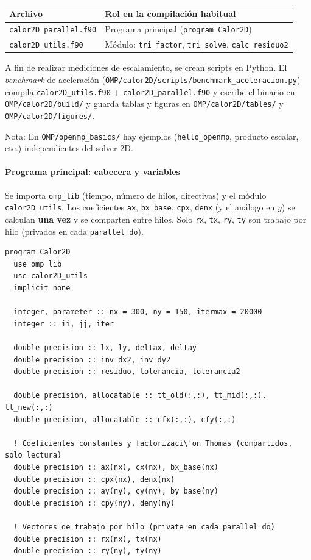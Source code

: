 \documentclass[11pt,a4paper]{article}
\begin{document}
\begin{center}
\begin{tabular}{ll}
\hline
Archivo & Rol en la compilaci\'on habitual \\
\hline
\texttt{calor2D\_parallel.f90} & Programa principal (\texttt{program Calor2D}) \\
\texttt{calor2D\_utils.f90}     & M\'odulo: \texttt{tri\_factor}, \texttt{tri\_solve}, \texttt{calc\_residuo2} \\
\hline
\end{tabular}
\end{center}

A fin de realizar mediciones de escalamiento, se crean scripts en Python. El 
\emph{benchmark} de aceleraci\'on (\texttt{OMP/calor2D/scripts/benchmark\_aceleracion.py}) compila
\texttt{calor2D\_utils.f90} + \texttt{calor2D\_parallel.f90} y escribe el binario en
\texttt{OMP/calor2D/build/} y guarda tablas y figuras en \texttt{OMP/calor2D/tables/} y
\texttt{OMP/calor2D/figures/}.

\medskip

Nota: En \texttt{OMP/openmp\_basics/} hay ejemplos
(\texttt{hello\_openmp}, producto escalar, etc.) independientes del solver 2D.

\paragraph{Programa principal: cabecera y variables}

\medskip

Se importa \texttt{omp\_lib} (tiempo, n\'umero de hilos, directivas) y el m\'odulo
\texttt{calor2D\_utils}. Los coeficientes \texttt{ax}, \texttt{bx\_base},
\texttt{cpx}, \texttt{denx} (y el an\'alogo en $y$) se calculan \textbf{una vez}
y se comparten entre hilos. Solo \texttt{rx}, \texttt{tx}, \texttt{ry},
\texttt{ty} son trabajo por hilo (privados en cada \texttt{parallel do}).

\begin{verbatim}
program Calor2D
  use omp_lib
  use calor2D_utils
  implicit none

  integer, parameter :: nx = 300, ny = 150, itermax = 20000
  integer :: ii, jj, iter

  double precision :: lx, ly, deltax, deltay
  double precision :: inv_dx2, inv_dy2
  double precision :: residuo, tolerancia, tolerancia2

  double precision, allocatable :: tt_old(:,:), tt_mid(:,:), tt_new(:,:)
  double precision, allocatable :: cfx(:,:), cfy(:,:)

  ! Coeficientes constantes y factorizaci\'on Thomas (compartidos, solo lectura)
  double precision :: ax(nx), cx(nx), bx_base(nx)
  double precision :: cpx(nx), denx(nx)
  double precision :: ay(ny), cy(ny), by_base(ny)
  double precision :: cpy(ny), deny(ny)

  ! Vectores de trabajo por hilo (private en cada parallel do)
  double precision :: rx(nx), tx(nx)
  double precision :: ry(ny), ty(ny)
\end{verbatim}
\end{document}
